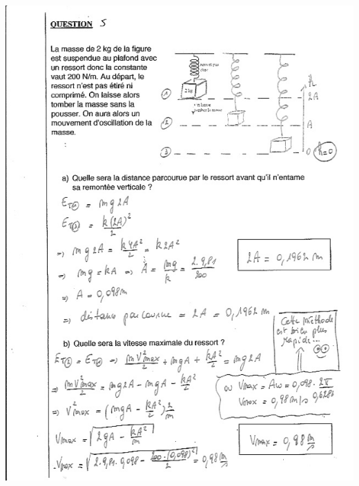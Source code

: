\includegraphics[width=18.196cm,height=24.897cm]{Pictures/100000010000026400000345B30134D27454F986.png}

